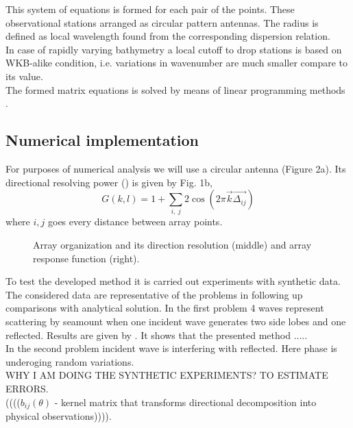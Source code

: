 This system of equations is formed for each pair of the points. These observational stations arranged as circular pattern antennas. The radius is defined as local wavelength found from the corresponding dispersion relation.\\
In case of rapidly varying bathymetry a local cutoff to drop stations is based on WKB-alike condition, i.e. variations in wavenumber are much smaller compare to its value.\\
The formed matrix equations is solved by means of linear programming methods \cite{haskell1981algorithm}.\\
\subsection{Numerical implementation}
For purposes of numerical analysis we will use a circular antenna (Figure 2a). Its directional resolving power (\cite{barber1963directional}) is given by Fig. 1b,
\begin{equation}
G(k,l) = 1 + \sum_{i,~j} 2\cos(2\pi \vec{k} \vec{\Delta_{ij}})
\end{equation}
where $i,j$ goes every distance between array points.\\
\begin{figure}
\caption{Array organization and its direction resolution (middle) and array response function (right).}
\end{figure}
To test the developed method it is carried out experiments with synthetic data. The considered data are representative of the problems in following up comparisons with analytical solution. In the first problem 4 waves represent scattering by seamount when one incident wave generates two side lobes and one reflected. Results are given by . It shows that the presented method .....\\
In the second problem incident wave is interfering with reflected. Here phase is underoging random variations.\\
WHY I AM DOING THE SYNTHETIC EXPERIMENTS? TO ESTIMATE ERRORS.\\
\small{(((($b_{ij}(\theta)$ - kernel matrix that transforms directional decomposition into physical observations)))).}\\

